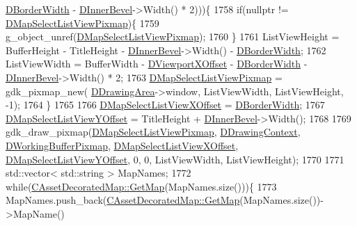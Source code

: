 \begin{DoxyCode}
      \hyperlink{classCApplicationData_a566b69c72fa982c6ecf8e47dc21df489}{DBorderWidth} - \hyperlink{classCApplicationData_a29a687c44dceb9e87a56d96612d59ab5}{DInnerBevel}->Width() * 2)))\{
1758         \textcolor{keywordflow}{if}(\textcolor{keyword}{nullptr} != \hyperlink{classCApplicationData_a76e4af228d69ca3c6b1cf0770ca2e7a0}{DMapSelectListViewPixmap})\{
1759             g\_object\_unref(\hyperlink{classCApplicationData_a76e4af228d69ca3c6b1cf0770ca2e7a0}{DMapSelectListViewPixmap});
1760         \}
1761         ListViewHeight = BufferHeight - TitleHeight - \hyperlink{classCApplicationData_a29a687c44dceb9e87a56d96612d59ab5}{DInnerBevel}->Width() - 
      \hyperlink{classCApplicationData_a566b69c72fa982c6ecf8e47dc21df489}{DBorderWidth};
1762         ListViewWidth = BufferWidth - \hyperlink{classCApplicationData_a306bba873ccc47126111305fe21ef3ff}{DViewportXOffset} - 
      \hyperlink{classCApplicationData_a566b69c72fa982c6ecf8e47dc21df489}{DBorderWidth} - \hyperlink{classCApplicationData_a29a687c44dceb9e87a56d96612d59ab5}{DInnerBevel}->Width() * 2;
1763         \hyperlink{classCApplicationData_a76e4af228d69ca3c6b1cf0770ca2e7a0}{DMapSelectListViewPixmap} = gdk\_pixmap\_new(
      \hyperlink{classCApplicationData_a4735f5d31632313e0b2a1659eb178987}{DDrawingArea}->window, ListViewWidth, ListViewHeight, -1);
1764     \}
1765     
1766     \hyperlink{classCApplicationData_aa5a89b442e384acdf1c2aefc7ce4233b}{DMapSelectListViewXOffset} = \hyperlink{classCApplicationData_a566b69c72fa982c6ecf8e47dc21df489}{DBorderWidth};
1767     \hyperlink{classCApplicationData_ae1a8eb3fff3cf5bc236564925bec1c8c}{DMapSelectListViewYOffset} = TitleHeight + 
      \hyperlink{classCApplicationData_a29a687c44dceb9e87a56d96612d59ab5}{DInnerBevel}->Width();
1768     
1769     gdk\_draw\_pixmap(\hyperlink{classCApplicationData_a76e4af228d69ca3c6b1cf0770ca2e7a0}{DMapSelectListViewPixmap}, 
      \hyperlink{classCApplicationData_aa6c5bea9bdcc64398e5a3f693661d37c}{DDrawingContext}, \hyperlink{classCApplicationData_afa34cf2780f38dd28c0c811e69d60a97}{DWorkingBufferPixmap}, 
      \hyperlink{classCApplicationData_aa5a89b442e384acdf1c2aefc7ce4233b}{DMapSelectListViewXOffset}, \hyperlink{classCApplicationData_ae1a8eb3fff3cf5bc236564925bec1c8c}{DMapSelectListViewYOffset}, 0, 
      0, ListViewWidth, ListViewHeight);
1770     
1771     std::vector< std::string > MapNames;       
1772     \textcolor{keywordflow}{while}(\hyperlink{classCAssetDecoratedMap_afafb067884070fe0340f8b7e63bdc099}{CAssetDecoratedMap::GetMap}(MapNames.size()))\{
1773         MapNames.push\_back(\hyperlink{classCAssetDecoratedMap_afafb067884070fe0340f8b7e63bdc099}{CAssetDecoratedMap::GetMap}(MapNames.size())->MapName()

\end{DoxyCode}
